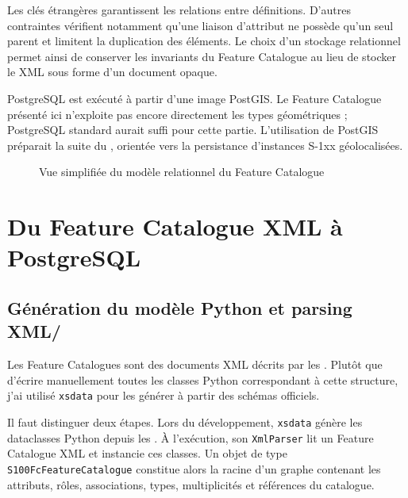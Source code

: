Les clés étrangères garantissent les relations entre définitions. D'autres contraintes vérifient notamment qu'une liaison d'attribut ne possède qu'un seul parent et limitent la duplication des éléments. Le choix d'un stockage relationnel permet ainsi de conserver les invariants du Feature Catalogue au lieu de stocker le XML sous forme d'un document opaque.

PostgreSQL est exécuté à partir d'une image PostGIS. Le Feature Catalogue présenté ici n'exploite pas encore directement les types géométriques ; PostgreSQL standard aurait suffi pour cette partie. L'utilisation de PostGIS préparait la suite du , orientée vers la persistance d'instances S-1xx géolocalisées.

\begin{figure}[H]
\centering
{}
\caption{Vue simplifiée du modèle relationnel du Feature Catalogue}
\label{fig:modele-relationnel-s100}
\end{figure}

\section{Du Feature Catalogue XML à PostgreSQL}

\subsection{Génération du modèle Python et parsing XML/}

Les Feature Catalogues sont des documents XML décrits par les  . Plutôt que d'écrire manuellement toutes les classes Python correspondant à cette structure, j'ai utilisé \texttt{xsdata} pour les générer à partir des schémas officiels.

Il faut distinguer deux étapes. Lors du développement, \texttt{xsdata} génère les dataclasses Python depuis les . À l'exécution, son \texttt{XmlParser} lit un Feature Catalogue XML et instancie ces classes. Un objet de type \texttt{S100FcFeatureCatalogue} constitue alors la racine d'un graphe contenant les attributs, rôles, associations, types, multiplicités et références du catalogue.


